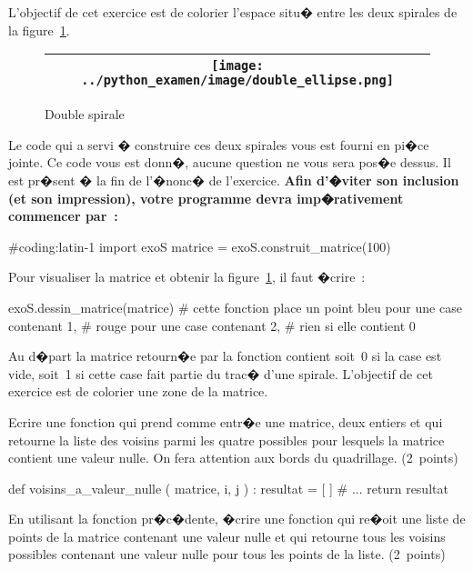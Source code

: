 L'objectif de cet exercice est de colorier l'espace situ� entre les deux spirales de la figure~\ref{double_spirale_2013}.


\begin{figure}[ht]
\begin{center}\begin{tabular}{|c|}\hline 
\texttt{[image: ../python\_examen/image/double\_ellipse.png]} \\ \hline
\end{tabular}
\end{center}
\caption{Double spirale}
\label{double_spirale_2013}
\end{figure}

Le code qui a servi � construire ces deux spirales vous est fourni en pi�ce jointe. Ce code vous est donn�, aucune question ne vous sera pos�e dessus. Il est pr�sent � la fin de l'�nonc� de l'exercice. \textbf{Afin d'�viter son inclusion (et son impression), votre programme devra imp�rativement commencer par~:}

\begin{verbatimx}
#coding:latin-1
import exoS
matrice = exoS.construit_matrice(100)
\end{verbatimx}

Pour visualiser la matrice et obtenir la figure~\ref{double_spirale_2013}, il faut �crire~:
\begin{verbatimx}
exoS.dessin_matrice(matrice)   # cette fonction place un point bleu pour une case contenant 1,
                               # rouge pour une case contenant 2,
                               # rien si elle contient 0
\end{verbatimx}

Au d�part la matrice retourn�e par la fonction  contient soit~0 si la case est vide, soit~1 si cette case fait partie du trac� d'une spirale. L'objectif de cet exercice est de colorier une zone de la matrice.

\exequest Ecrire une fonction qui prend comme entr�e une matrice, deux entiers et qui retourne la liste des voisins parmi les quatre possibles pour lesquels la matrice contient une valeur nulle. On fera attention aux bords du quadrillage. (2~points)

\begin{verbatimx}
def voisins_a_valeur_nulle ( matrice, i, j ) :
    resultat = [ ]
    # ...
    return resultat
\end{verbatimx}


\exequest En utilisant la fonction pr�c�dente, �crire une fonction qui re�oit une liste de points de la matrice contenant une valeur nulle et qui retourne tous les voisins possibles contenant une valeur nulle pour tous les points de la liste. (2~points)

